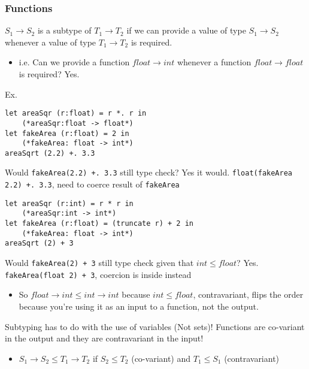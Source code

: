 \documentclass[11pt]{article}
\begin{document}
\subsubsection{Functions}
\label{sec:orge0682c4}
\(S_1 \to S_2\) is a subtype of \(T_1 \to T_2\) if we can provide a value of type \(S_1 \to S_2\) whenever a value of type \(T_1 \to T_2\) is required.
\begin{itemize}
\item i.e. Can we provide a function \(float \to int\) whenever a function \(float \to float\) is required? Yes.
\end{itemize}
Ex.
\begin{verbatim}
let areaSqr (r:float) = r *. r in
    (*areaSqr:float -> float*)
let fakeArea (r:float) = 2 in
    (*fakeArea: float -> int*)
areaSqrt (2.2) +. 3.3
\end{verbatim}
Would \texttt{fakeArea(2.2) +. 3.3} still type check? Yes it would. \texttt{float(fakeArea 2.2) +. 3.3}, need to coerce result of \texttt{fakeArea}

\begin{verbatim}
let areaSqr (r:int) = r * r in
    (*areaSqr:int -> int*)
let fakeArea (r:float) = (truncate r) + 2 in
    (*fakeArea: float -> int*)
areaSqrt (2) + 3
\end{verbatim}
Would \texttt{fakeArea(2) + 3} still type check given that \(int \leq float\)? Yes. \texttt{fakeArea(float 2) + 3}, coercion is inside instead
\begin{itemize}
\item So \(float \to int \leq int \to int\) because \(int \leq float\), contravariant, flips the order because you're using it as an input to a function, not the output.
\end{itemize}
Subtyping has to do with the use of variables (Not sets)! Functions are co-variant in the output and they are contravariant in the input!
\begin{itemize}
\item \(S_1 \to S_2 \leq T_1 \to T_2\) if \(S_2 \leq T_2\) (co-variant) and \(T_1 \leq S_1\) (contravariant)
\end{itemize}
\end{document}
